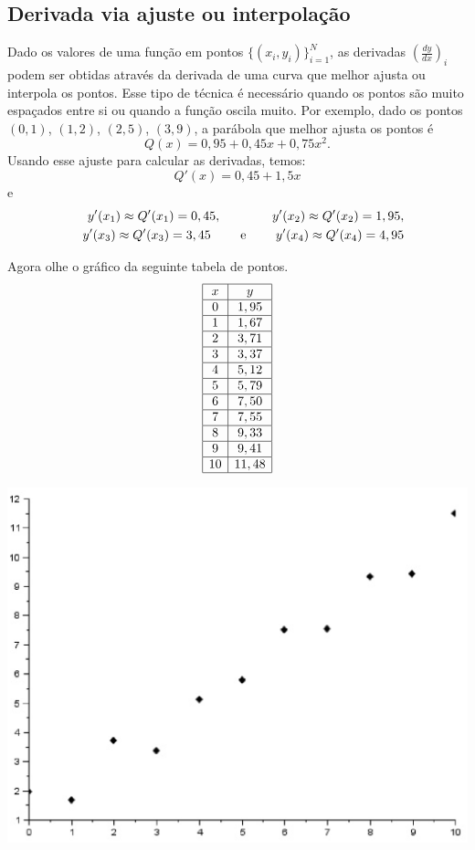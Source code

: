 \subsection{Derivada via ajuste ou interpolação}

Dado os valores de uma função em pontos $\{(x_i,y_i)\}_{i=1}^N$, as derivadas $\left(\frac{dy}{dx}\right)_i$ podem ser obtidas através da derivada de uma curva que melhor ajusta ou interpola os pontos. Esse tipo de técnica é necessário quando os pontos são muito espaçados entre si ou quando a função oscila muito. Por exemplo, dado os pontos $(0,1)$, $(1,2)$, $(2,5)$, $(3,9)$, a parábola que melhor ajusta os pontos é
$$
Q(x)=0,95 + 0,45x + 0,75x^2.
$$
Usando esse ajuste para calcular as derivadas, temos:
$$
Q'(x)=0,45 + 1,5x
$$
e
\begin{eqnarray*}
&&y'(x_1)\approx Q'(x_1)=0,45, \qquad\qquad y'(x_2)\approx Q'(x_2)=1,95, \\&& y'(x_3)\approx Q'(x_3)=3,45 \qquad ~ \hbox{e} ~ \qquad y'(x_4)\approx Q'(x_4)=4,95
\end{eqnarray*}

Agora olhe o gráfico da seguinte tabela de pontos.
$$
\begin{array}{|c|c|}
\hline
x&y\\
\hline
0    & 1,95  \\
\hline
    1&     1,67  \\
		\hline
    2 &    3,71  \\
		\hline
    3  &   3,37  \\
		\hline
    4   &  5,12   \\
		\hline
    5&     5,79  \\
		\hline
    6 &    7,50  \\
		\hline
    7  &   7,55  \\
		\hline
    8   &  9,33  \\
		\hline
    9   &  9,41   \\
		\hline
    10  &  11,48  \\
		\hline
\end{array}
$$
\begin{center}
\includegraphics[scale=0.5]{./cap_derint/pics/graf_der.eps}
\end{center}

